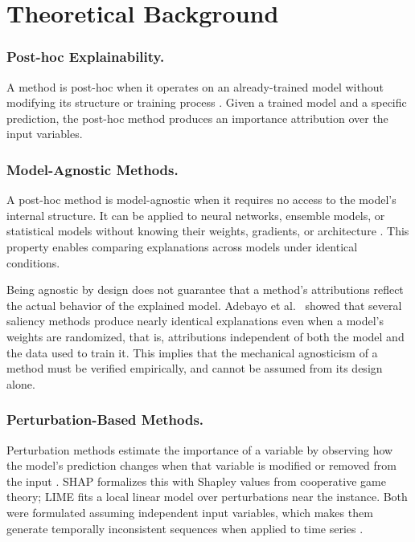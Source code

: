 \documentclass[runningheads]{llncs}
\begin{document}
\section{Theoretical Background}
\label{sec:background}

\subsubsection{Post-hoc Explainability.}
A method is post-hoc when it operates on an already-trained model
without modifying its structure or training process \cite{arsenault2025}.
Given a trained model and a specific prediction, the post-hoc method
produces an importance attribution over the input variables.

\subsubsection{Model-Agnostic Methods.}
A post-hoc method is model-agnostic when it requires no access to
the model's internal structure. It can be applied to neural networks,
ensemble models, or statistical models without knowing their weights,
gradients, or architecture \cite{arsenault2025}. This property
enables comparing explanations across models under identical
conditions.

Being agnostic by design does not guarantee that a method's
attributions reflect the actual behavior of the explained model.
Adebayo et al.~\cite{adebayo2018} showed that several saliency
methods produce nearly identical explanations even when a model's
weights are randomized, that is, attributions independent of both
the model and the data used to train it. This implies that the
mechanical agnosticism of a method must be verified empirically, and
cannot be assumed from its design alone.

\subsubsection{Perturbation-Based Methods.}
Perturbation methods estimate the importance of a variable by
observing how the model's prediction changes when that variable is
modified or removed from the input \cite{arsenault2025}. SHAP
formalizes this with Shapley values from cooperative game theory;
LIME fits a local linear model over perturbations near the instance.
Both were formulated assuming independent input variables, which
makes them generate temporally inconsistent sequences when applied
to time series \cite{tonekaboni2020,crabbe2021}.
\end{document}
